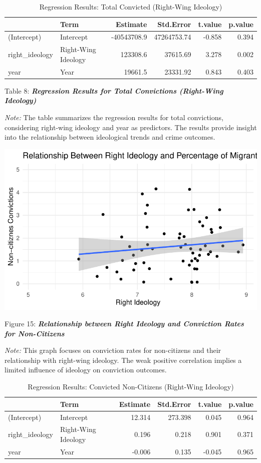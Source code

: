 \documentclass[
]{article}
\begin{document}
\begin{table}
\centering
\caption{Regression Results: Total Convicted (Right-Wing Ideology)}
\centering
\begin{tabular}[t]{l|l|r|r|r|r}
\hline
  & Term & Estimate & Std.Error & t.value & p.value\\
\hline
(Intercept) & Intercept & -40543708.9 & 47264753.74 & -0.858 & 0.394\\
\hline
right\_ideology & Right-Wing Ideology & 123308.6 & 37615.69 & 3.278 & 0.002\\
\hline
year & Year & 19661.5 & 23331.92 & 0.843 & 0.403\\
\hline
\end{tabular}
\end{table}

Table 8: \textbf{\emph{Regression Results for Total Convictions
(Right-Wing Ideology)}}

\emph{Note:} The table summarizes the regression results for total
convictions, considering right-wing ideology and year as predictors. The
results provide insight into the relationship between ideological trends
and crime outcomes.

\includegraphics{DataMan_Project_files/figure-pdf/unnamed-chunk-48-1.pdf}

Figure 15: \textbf{\emph{Relationship between Right Ideology and
Conviction Rates for Non-Citizens}}

\emph{Note:} This graph focuses on conviction rates for non-citizens and
their relationship with right-wing ideology. The weak positive
correlation implies a limited influence of ideology on conviction
outcomes.

\begin{table}
\centering
\caption{Regression Results: Convicted Non-Citizens (Right-Wing Ideology)}
\centering
\begin{tabular}[t]{l|l|r|r|r|r}
\hline
  & Term & Estimate & Std.Error & t.value & p.value\\
\hline
(Intercept) & Intercept & 12.314 & 273.398 & 0.045 & 0.964\\
\hline
right\_ideology & Right-Wing Ideology & 0.196 & 0.218 & 0.901 & 0.371\\
\hline
year & Year & -0.006 & 0.135 & -0.045 & 0.965\\
\hline
\end{tabular}
\end{table}
\end{document}

